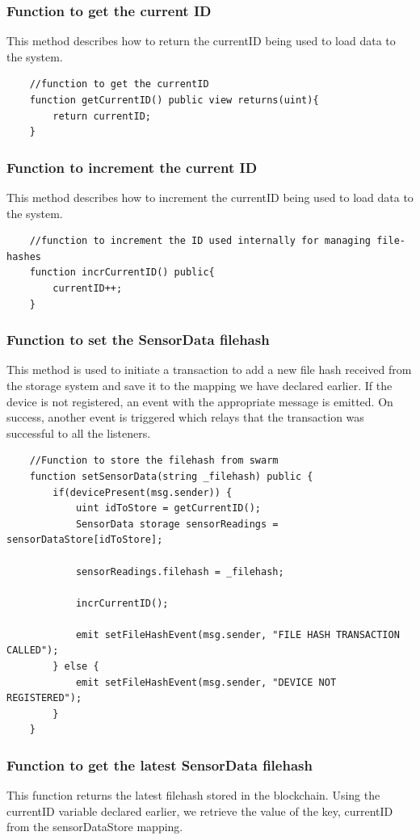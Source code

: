 \documentclass[11pt,openright]{report}
\begin{document}
\subsubsection{Function to get the current ID}
This method describes how to return the currentID being used to load data to the system.
\begin{verbatim}
    //function to get the currentID
    function getCurrentID() public view returns(uint){
        return currentID;
    }
\end{verbatim}
\subsubsection{Function to increment the current ID}
This method describes how to increment the currentID being used to load data to the system.
\begin{verbatim}
    //function to increment the ID used internally for managing file-hashes
    function incrCurrentID() public{
        currentID++;
    }
\end{verbatim}

\subsubsection{Function to set the SensorData filehash}
This method is used to initiate a transaction to add a new file hash received from the storage system and save it to the mapping we have declared earlier. If the device is not registered, an event with the appropriate message is emitted. On success, another event is triggered which relays that the transaction was successful to all the listeners.

\begin{verbatim}
    //Function to store the filehash from swarm
    function setSensorData(string _filehash) public {
        if(devicePresent(msg.sender)) {
            uint idToStore = getCurrentID();
            SensorData storage sensorReadings = sensorDataStore[idToStore];

            sensorReadings.filehash = _filehash;
       
            incrCurrentID();
            
            emit setFileHashEvent(msg.sender, "FILE HASH TRANSACTION CALLED");
        } else {
            emit setFileHashEvent(msg.sender, "DEVICE NOT REGISTERED");
        }
    }
\end{verbatim}

\subsubsection{Function to get the latest SensorData filehash}
This function returns the latest filehash stored in the blockchain. Using the currentID variable declared earlier, we retrieve the value of the key, currentID from the sensorDataStore mapping.
\end{document}
